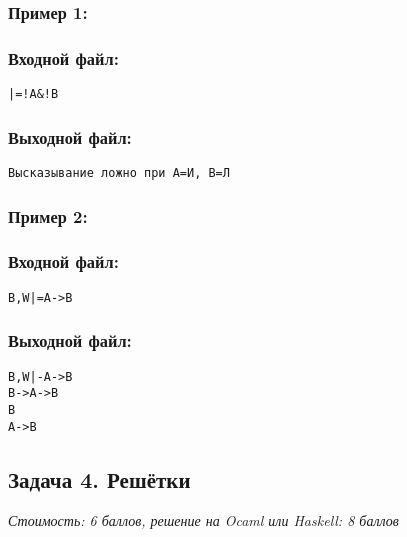 \documentclass[11pt,a4paper,oneside]{article}
\begin{document}
\subsubsection*{Пример 1:}
\begin{minipage}[t]{.5\textwidth}
\subsubsection*{Входной файл:}
\begin{verbatim}
|=!A&!B
\end{verbatim}
\end{minipage}
\begin{minipage}[t]{.5\textwidth}
\subsubsection*{Выходной файл:}
\begin{verbatim}
Высказывание ложно при A=И, B=Л
\end{verbatim}
\end{minipage}

\subsubsection*{Пример 2:}
\begin{minipage}[t]{.5\textwidth}
\subsubsection*{Входной файл:}
\begin{verbatim}
B,W|=A->B
\end{verbatim}
\end{minipage}
\begin{minipage}[t]{.5\textwidth}
\subsubsection*{Выходной файл:}
\begin{verbatim}
B,W|-A->B
B->A->B
B
A->B
\end{verbatim}
\end{minipage}

\subsection*{Задача 4. Решётки}
{\it Стоимость: 6 баллов, решение на Ocaml или Haskell: 8 баллов }\vspace{2mm}\\
\end{document}

